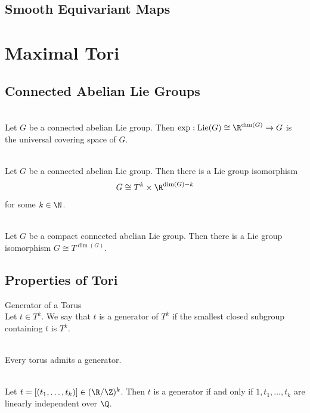 \documentclass[a4paper]{article}
\begin{document}
\subsection{Smooth Equivariant Maps}

\pagebreak
\section{Maximal Tori}
\subsection{Connected Abelian Lie Groups}
\begin{prp}{}{}\\
Let $G$ be a connected abelian Lie group. Then $\text{exp}:\text{Lie}(G)\cong\R^{\dim(G)}\to G$ is the universal covering space of $G$. 
\end{prp}

\begin{prp}{}{}\\
Let $G$ be a connected abelian Lie group. Then there is a Lie group isomorphism $$G\cong T^k\times\R^{\dim(G)-k}$$ for some $k\in\N$. 
\end{prp}

\begin{crl}{}{}\\
Let $G$ be a compact connected abelian Lie group. Then there is a Lie group isomorphism $G\cong T^{\dim(G)}$. 
\end{crl}

\subsection{Properties of Tori}
\begin{defn}{Generator of a Torus}{}\\
Let $t\in T^k$. We say that $t$ is a generator of $T^k$ if the smallest closed subgroup containing $t$ is $T^k$. 
\end{defn}

\begin{prp}{}{}\\
Every torus admits a generator. 
\end{prp}

\begin{prp}{}{}\\
Let $t=[(t_1,\dots,t_k)]\in(\R/\Z)^k$. Then $t$ is a generator if and only if $1,t_1,\dots,t_k$ are linearly independent over $\Q$. 
\end{prp}
\end{document}
